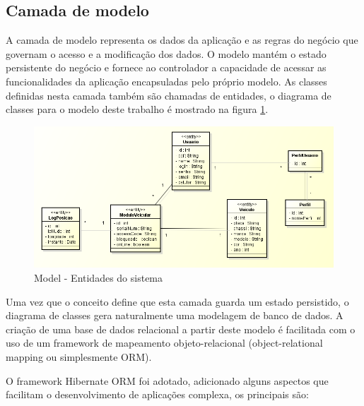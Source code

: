 \subsection{Camada de modelo}

A camada de modelo representa os dados da aplicação e as regras do negócio que governam o acesso e a modificação dos dados. O modelo mantém o estado persistente do negócio e fornece ao controlador a capacidade de acessar as funcionalidades da aplicação encapsuladas pelo próprio modelo. As classes definidas nesta camada também são chamadas de entidades, o diagrama de classes para o modelo deste trabalho é mostrado na figura \ref{fig:webmanmodel}.

\begin{figure}[!htb]
	\centering
	\includegraphics[width=\textwidth]{figures/model.png}
	\caption{Model - Entidades do sistema}
	\label{fig:webmanmodel}
\end{figure}

Uma vez que o conceito define que esta camada guarda um estado persistido, o diagrama de classes gera naturalmente uma modelagem de banco de dados. A criação de uma base de dados relacional a partir deste modelo é facilitada com o uso de um framework de mapeamento objeto-relacional (object-relational mapping ou simplesmente ORM).

O framework Hibernate ORM foi adotado, adicionado alguns aspectos que facilitam o desenvolvimento de aplicações complexa, os principais são:

